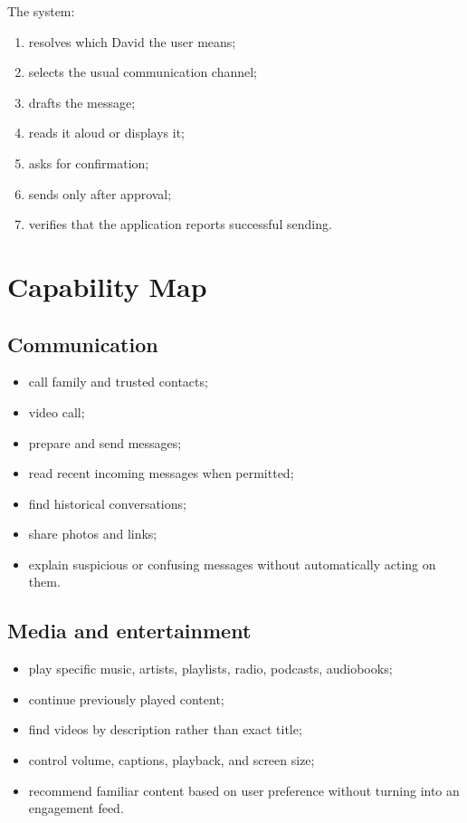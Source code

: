 \documentclass[11pt]{article}
\begin{document}
The system:
\begin{enumerate}[leftmargin=*]
    \item resolves which David the user means;
    \item selects the usual communication channel;
    \item drafts the message;
    \item reads it aloud or displays it;
    \item asks for confirmation;
    \item sends only after approval;
    \item verifies that the application reports successful sending.
\end{enumerate}

\section{Capability Map}

\subsection{Communication}
\begin{itemize}[leftmargin=*]
    \item call family and trusted contacts;
    \item video call;
    \item prepare and send messages;
    \item read recent incoming messages when permitted;
    \item find historical conversations;
    \item share photos and links;
    \item explain suspicious or confusing messages without automatically acting on them.
\end{itemize}

\subsection{Media and entertainment}
\begin{itemize}[leftmargin=*]
    \item play specific music, artists, playlists, radio, podcasts, audiobooks;
    \item continue previously played content;
    \item find videos by description rather than exact title;
    \item control volume, captions, playback, and screen size;
    \item recommend familiar content based on user preference without turning into an engagement feed.
\end{itemize}
\end{document}
